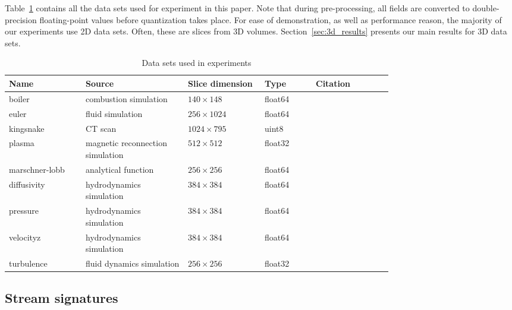 Table~\ref{tbl:data-sets} contains all the data sets used for experiment in this paper. Note that
during pre-processing, all fields are converted to double-precision floating-point values before
quantization takes place. For ease of demonstration, as well as performance reason, the majority of
our experiments use 2D data sets. Often, these are slices from 3D volumes.
Section~\ref{sec:3d_results} presents our main results for 3D data sets. 

\begin{table}[t]
  \caption{Data sets used in experiments}
  \centering
  \begin{tabular}{p{0.15\linewidth}p{0.20\linewidth}p{0.15\linewidth}p{0.10\linewidth}p{0.15\linewidth}}
  \hline
  Name & Source & Slice dimension & Type & Citation\\
  \hline
  boiler & combustion simulation& $140\times 148$ & float64 &\\
  euler & fluid simulation& $256\times 1024$ & float64 &\\
  kingsnake & CT scan & $1024\times 795$ & uint8 &\\
  plasma & magnetic reconnection simulation& $512\times 512$ & float32 &\\
  marschner-lobb & analytical function& $256\times 256$ & float64 &\\
  diffusivity & hydrodynamics simulation& $384\times 384$ & float64 &\\
  pressure & hydrodynamics simulation& $384\times 384$ & float64 &\\
  velocityz & hydrodynamics simulation& $384\times 384$ & float64 &\\
  turbulence & fluid dynamics simulation& $256\times 256$ & float32 &\\
  \hline
  \end{tabular}
\label{tbl:data-sets}
\end{table}

\subsection{Stream signatures}
\label{sec:stream-signature}

